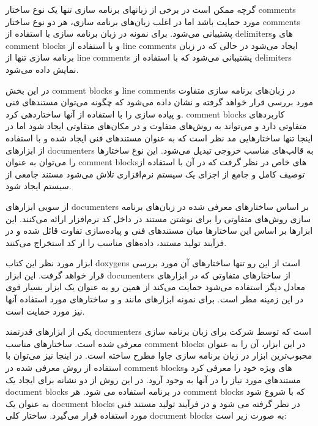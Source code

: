گرچه ممکن است در برخی از زبانهای برنامه سازی تنها یک نوع ساختار \glspl{comment}
مورد حمایت باشد اما در اغلب زبان‌های برنامه سازی، هر دو نوع ساختار
\glspl{comment} پشتیبانی می‌شود. برای نمونه در زبان برنامه سازی  با
استفاده از \glspl{delimiter}های \lr{/*} و \lr{*/} \glspl{comment block} و با
استفاده از \lr{//} \glspl{line comment} ایجاد می‌شود در حالی که در زبان برنامه
سازی  تنها از \glspl{line comment} پشتیبانی می‌شود که با استفاده از
\glspl{delimiter} \lr{--} نمایش داده می‌شود\cite{wiki9}.

در این بخش \glspl{comment block} و \glspl{line comment} در زبان‌های برنامه سازی
متفاوت مورد بررسی قرار خواهد گرفته و نشان داده می‌شود که چگونه می‌توان مستند‌های
فنی و پیاده سازی را با استفاده از آنها ساختاردهی کرد.
\glspl{comment block} کاربردهای متفاوتی دارد و می‌تواند به روش‌های متفاوت و در
مکان‌های متفاوتی ایجاد شود اما در اینجا تنها ساختارهایی مد نظر است که به عنوان
مستندهای فنی ایجاد شده و با استفاده از ابزارهای \glspl{documenter} به قالب‌های
مناسب خروجی تبدیل می‌شود. این نوع ساختارها را می‌توان به عنوان \glspl{comment
block}های خاص در نظر گرفت که در آن با استفاده از توصیف کامل و جامع از اجزای یک
سیستم نرم‌افزاری تلاش می‌شود مستند جامعی از سیستم ایجاد شود. 

از سویی ابزارهای \glspl{documenter} بر اساس ساختارهای معرفی شده در زبان‌های
برنامه سازی روش‌های متفاوتی را برای نوشتن مستند در داخل کد نرم‌افزار ارائه
می‌کنند. این ابزارها بر اساس این ساختارها میان مستندهای فنی و پیاده‌سازی تفاوت
قائل شده و در فرآیند تولید مستند، داده‌های مناسب را از کد استخراج می‌کنند.

\begin{note}
ابزار مورد نظر این کتاب \glspl{doxygen} است از این رو تنها ساختارهای آن مورد
بررسی قرار خواهد گرفت. این ابزار \glspl{documenter} از ساختارهای متفاوتی که در
ابزارهای معادل دیگر استفاده می‌شود حمایت می‌کند از همین رو به عنوان یک ابزار
بسیار قوی در این زمینه مطر است. برای نمونه ابزارهای مانند  و
 و ساختارهای مورد استفاده آنها نیز مورد حمایت است.
\end{note}

یکی از ابزارهای قدرتمند \glspl{documenter}  است که توسط شرکت
 برای زبان برنامه سازی  معرفی شده است. ساختارهای
مناسب \glspl{comment block} در این ابزار، آن را به عنوان محبوب‌ترین ابزار در
زبان برنامه سازی جاوا مطرح ساخته است. در اینجا نیز می‌توان با استفاده از روش
معرفی شده در  \glspl{comment block}های ویژه خود را معرفی کرد و
مستند‌های مورد نیاز را در آنها به وحود آرود. 
در این روش از دو نشانه \lr{**} برای ایجاد یک \glspl{document block} 
در برنامه استفاده می شود. هر \glspl{comment block} که با \lr{/**} شروع شود به
عنوان یک \glspl{document block} در نظر گرفته می شود و در فرآیند تولید مستند فنی
مورد استفاده قرار می‌گیرد. ساختار کلی \glspl{document block} به صورت زیر است:

